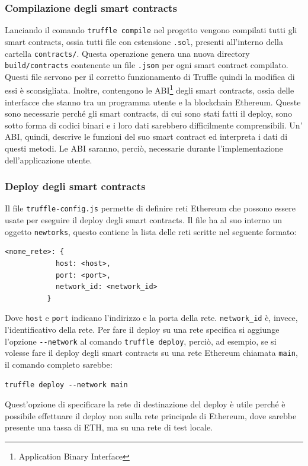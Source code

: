 \documentclass[a4paper]{article}
\begin{document}
        \subsubsection{Compilazione degli smart contracts}
        Lanciando il comando \verb|truffle compile| nel progetto vengono compilati tutti gli smart contracts, ossia tutti file con estensione \verb|.sol|, presenti all'interno della cartella \verb|contracts/|.
        Questa operazione genera una nuova directory \verb|build/contracts| contenente un file \verb|.json| per ogni smart contract compilato. Questi file servono per il corretto funzionamento di Truffle quindi la modifica di essi è sconsigliata.
        Inoltre, contengono le ABI\footnote{Application Binary Interface} degli smart contracts, ossia delle interfacce che stanno tra un programma utente e la blockchain Ethereum. Queste sono necessarie perché gli smart contracts, di cui sono stati fatti il deploy, sono sotto forma
        di codici binari e i loro dati sarebbero difficilmente comprensibili. Un' ABI, quindi, descrive le funzioni del suo smart contract ed interpreta i dati di questi metodi. Le  ABI saranno, perciò, necessarie durante l'implementazione dell'applicazione utente.
        \subsubsection{Deploy degli smart contracts}
        Il file \verb|truffle-config.js| permette di definire reti Ethereum che possono essere usate per eseguire il deploy degli smart contracts. Il file ha al suo interno un oggetto \verb|newtorks|, questo contiene la lista delle reti scritte nel seguente formato:
        \begin{lstlisting}[style=ES6, title={Esempio di definizione di una rete Ethereum}]
          <nome_rete>: {
            host: <host>,
            port: <port>,
            network_id: <network_id>
          }\end{lstlisting}
        Dove \verb|host| e \verb|port| indicano l'indirizzo e la porta della rete. \verb|network_id| è, invece, l'identificativo della rete.
        \newline
        Per fare il deploy su una rete specifica si aggiunge l'opzione \verb|--network| al comando \verb|truffle deploy|, perciò, ad esempio,
        se si volesse fare il deploy degli smart contracts su una rete Ethereum chiamata \verb|main|, il comando completo sarebbe:
        \begin{lstlisting}[style=ES6, title={Esempio di deploy specificando la rete}]
          truffle deploy --network main\end{lstlisting}
        Quest'opzione di specificare la rete di destinazione del deploy è utile perché è possibile effettuare il deploy non sulla rete principale di Ethereum, dove sarebbe presente una tassa di ETH, ma su una rete di test locale. 
\end{document}
